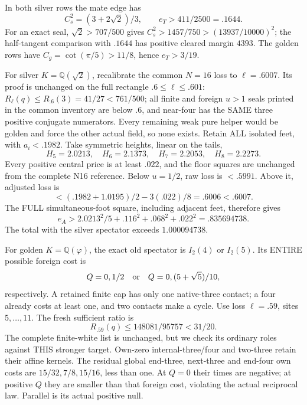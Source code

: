 \documentclass[11pt]{article}
\begin{document}
In both silver rows the mate edge has
\[
 C_s^2=(3+2\sqrt2)/3,\qquad e_T>411/2500=.1644 .
\]
For an exact seal, \(\sqrt2>707/500\)
gives \(C_s^2>1457/750>(13937/10000)^2\);
the half-tangent comparison with \(.1644\)
has positive cleared margin \(4393\).
The golden rows have
\(C_g=\cot(\pi/5)>11/8\), hence
\(e_T>3/19\).

For silver \(K=\mathbb Q(\sqrt2)\),
recalibrate the common \(N=16\) loss to
\(\ell=.6007\).
Its proof is unchanged on the full rectangle
\(.6\le\ell\le.601\):
\(R_\ell(q)\le R_{.6}(3)=41/27<761/500\);
all finite and foreign \(u>1\) seals
printed in the common inventory are below
\(.6\), and near-four has the SAME three
positive conjugate numerators.
Every remaining weak pure helper would
be golden and force the other actual field,
so none exists.
Retain ALL isolated feet, with
\(a_i<.1982\).
Take symmetric heights, linear on the tails,
\[
             H_5=2.0213,\quad H_6=2.1373,\quad
             H_7=2.2053,\quad H_8=2.2273 .
\]
Every positive central price is at least
\(.022\), and the floor squares are unchanged
from the complete N16 reference.
Below \(u=1/2\), raw loss is \(<.5991\).
Above it, adjusted loss is
\[
             <(.1982+1.0195)/2-3(.022)/8
                          =.6006<.6007 .
\]
The FULL simultaneous-foot square, including
adjacent feet, therefore gives
\[
                 e_A>2.0213^2/5+.116^2+.068^2+.022^2
                       =.835694738 .
\]
The total with the silver spectator
exceeds \(1.000094738\).

For golden \(K=\mathbb Q(\varphi)\),
the exact old spectator is \(I_2(4)\)
or \(I_2(5)\).
Its ENTIRE possible foreign cost is
\[
 Q=0,1/2\quad\hbox{or}\quad Q=0,(5+\sqrt5)/10,
\]
respectively.
A retained finite cap has only one
native-three contact; a four already costs
at least one, and two contacts make a cycle.
Use loss \(\ell=.59\), sites \(5,\ldots,11\).
The fresh sufficient ratio is
\[
                  R_{.59}(q)\le148081/95757<31/20 .
\]
The complete finite-white list is unchanged,
but we check its ordinary roles against
THIS stronger target.
Own-zero internal-three/four and two-three
retain their affine kernels.
The residual global end-three, next-three
and end-four own costs are \(15/32,7/8,15/16\),
less than one.
At \(Q=0\) their times are negative;
at positive \(Q\) they are smaller than
that foreign cost, violating the actual
reciprocal law.
Parallel is its actual positive null.
\end{document}
